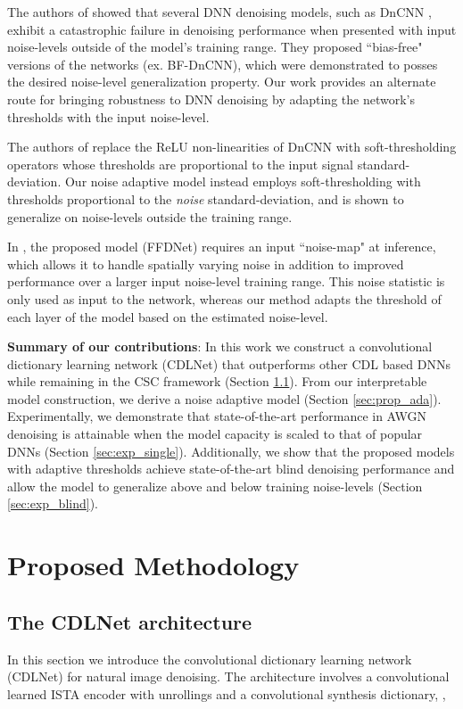 \documentclass[conference]{IEEEtran}
\newcommand{\soa}{state-of-the-art }
\begin{document}
The authors of \cite{Mohan2020} showed that several DNN denoising models, such as DnCNN \cite{DnCNN}, exhibit a catastrophic failure in denoising performance when presented with input noise-levels outside of the model's training range. They proposed ``bias-free" versions of the networks (ex. BF-DnCNN), which were demonstrated to posses the desired noise-level generalization property. Our work provides an alternate route for bringing robustness to DNN denoising by adapting the network's thresholds with the input noise-level. 

The authors of \cite{Isogawa2017} replace the ReLU non-linearities of DnCNN \cite{DnCNN} with soft-thresholding operators whose thresholds are proportional to the input signal standard-deviation. 
Our noise adaptive model instead employs soft-thresholding with thresholds proportional to the \textit{noise} standard-deviation, and is shown to generalize on noise-levels outside the training range.

In \cite{FFDNet}, the proposed model (FFDNet) requires an input ``noise-map" at inference, which allows it to handle spatially varying noise in addition to improved performance over a larger input noise-level training range. This noise statistic is only used as input to the network, whereas our method adapts the threshold of each layer of the model based on the estimated noise-level. 

\textbf{Summary of our contributions}: In this work we construct a convolutional dictionary learning network (CDLNet) that outperforms other CDL based DNNs while remaining in the CSC framework (Section \ref{sec:prop_arch}). From our interpretable model construction, we derive a noise adaptive model (Section \ref{sec:prop_ada}). Experimentally, we demonstrate that \soa performance in AWGN denoising is attainable when the model capacity is scaled to that of popular DNNs (Section \ref{sec:exp_single}). Additionally, we show that the proposed models with adaptive thresholds achieve \soa blind denoising performance and allow the model to generalize above and below training noise-levels (Section \ref{sec:exp_blind}). 

\section{Proposed Methodology} \label{sec:proposed}

\subsection{The CDLNet architecture} \label{sec:prop_arch}
In this section we introduce the convolutional dictionary learning network (CDLNet) for natural image denoising. The architecture involves a convolutional learned ISTA encoder with  unrollings and a convolutional synthesis dictionary, ,
\end{document}
